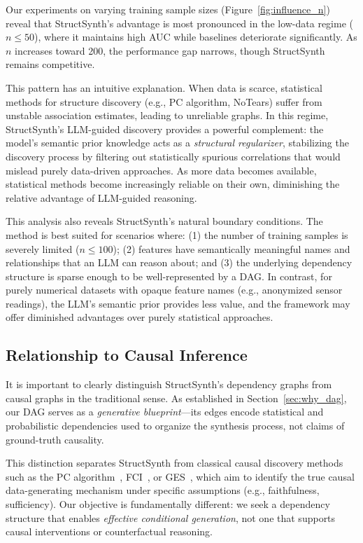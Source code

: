 Our experiments on varying training sample sizes (Figure~\ref{fig:influence_n}) reveal that StructSynth's advantage is most pronounced in the low-data regime ($n \leq 50$), where it maintains high AUC while baselines deteriorate significantly. As $n$ increases toward 200, the performance gap narrows, though StructSynth remains competitive.

This pattern has an intuitive explanation. When data is scarce, statistical methods for structure discovery (e.g., PC algorithm, NoTears) suffer from unstable association estimates, leading to unreliable graphs. In this regime, StructSynth's LLM-guided discovery provides a powerful complement: the model's semantic prior knowledge acts as a \emph{structural regularizer}, stabilizing the discovery process by filtering out statistically spurious correlations that would mislead purely data-driven approaches. As more data becomes available, statistical methods become increasingly reliable on their own, diminishing the relative advantage of LLM-guided reasoning.

This analysis also reveals StructSynth's natural boundary conditions. The method is best suited for scenarios where: (1) the number of training samples is severely limited ($n \leq 100$); (2) features have semantically meaningful names and relationships that an LLM can reason about; and (3) the underlying dependency structure is sparse enough to be well-represented by a DAG. In contrast, for purely numerical datasets with opaque feature names (e.g., anonymized sensor readings), the LLM's semantic prior provides less value, and the framework may offer diminished advantages over purely statistical approaches.


\subsection{Relationship to Causal Inference}

It is important to clearly distinguish StructSynth's dependency graphs from causal graphs in the traditional sense. As established in Section~\ref{sec:why_dag}, our DAG serves as a \emph{generative blueprint}---its edges encode statistical and probabilistic dependencies used to organize the synthesis process, not claims of ground-truth causality.

This distinction separates StructSynth from classical causal discovery methods such as the PC algorithm~\cite{spirtes2000causation}, FCI~\cite{spirtes2000causation}, or GES~\cite{chickering2002optimal}, which aim to identify the true causal data-generating mechanism under specific assumptions (e.g., faithfulness, sufficiency). Our objective is fundamentally different: we seek a dependency structure that enables \emph{effective conditional generation}, not one that supports causal interventions or counterfactual reasoning.


